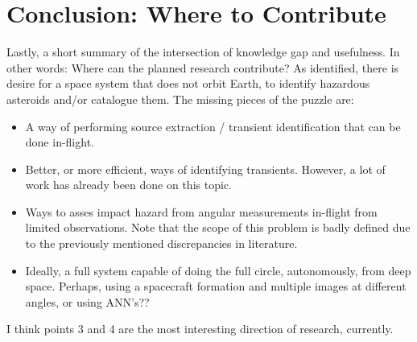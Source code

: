 \documentclass[a4paper,10pt]{article}
\begin{document}
\section{Conclusion: Where to Contribute}
Lastly, a short summary of the intersection of knowledge gap and usefulness. In other words: Where can the planned research contribute? As identified, there is desire for a space system that does not orbit Earth, to identify hazardous asteroids and/or catalogue them. The missing pieces of the puzzle are:
\begin{itemize}
 \item A way of performing source extraction / transient identification that can be done in-flight. 
 \item Better, or more efficient, ways of identifying transients. However, a lot of work has already been done on this topic.
 \item Ways to asses impact hazard from angular measurements in-flight from limited observations. Note that the scope of this problem is badly defined due to the previously mentioned discrepancies in literature.
 \item Ideally, a full system capable of doing the full circle, autonomously, from deep space. Perhaps, using a spacecraft formation and multiple images at different angles, or using ANN's??
\end{itemize}
I think points 3 and 4 are the most interesting direction of research, currently.
\end{document}
